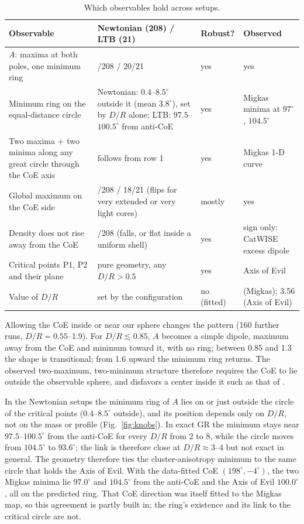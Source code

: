 \documentclass[11pt,a4paper]{article}
\newcommand{\dg}{^\circ}
\begin{document}
\begin{table}[!htb]\centering\small
\caption{Which observables hold across setups.}\label{tab:knobs}
\begin{tabularx}{\textwidth}{>{\raggedright\arraybackslash}p{5.2cm}>{\raggedright\arraybackslash}X>{\raggedright\arraybackslash}p{2.5cm}>{\raggedright\arraybackslash}p{2.3cm}}\toprule
Observable & Newtonian (208) / LTB (21) & Robust? & Observed\\\midrule
$A$: maxima at both poles, one minimum ring & 208/208 / 20/21 & yes & yes\\
Minimum ring on the equal-distance circle & Newtonian: $0.4$--$8.5\dg$ outside it (mean $3.8\dg$), set by $D/R$ alone; LTB: $97.5$--$100.5\dg$ from anti-CoE & yes & Migkas minima at $97\dg$, $104.5\dg$\\
Two maxima + two minima along any great circle through the CoE axis & follows from row 1 & yes & Migkas 1-D curve\\
Global maximum on the CoE side & 180/208 / 18/21 (flips for very extended or very light cores) & mostly & yes\\
Density does not rise away from the CoE & 208/208 (falls, or flat inside a uniform shell) & yes & sign only: CatWISE excess dipole\\
Critical points P1, P2 and their plane & pure geometry, any $D/R>0.5$ & yes & Axis of Evil\\
Value of $D/R$ & set by the configuration & no (fitted) & 3.44 (Migkas); 3.56 (Axis of Evil)\\\bottomrule
\end{tabularx}
\end{table}

Allowing the CoE inside or near our sphere changes the pattern (160 further runs, $D/R=0.55$--1.9). For $D/R\lesssim0.85$, $A$ becomes a simple dipole, maximum away from the CoE and minimum toward it, with no ring; between 0.85 and 1.3 the shape is transitional; from 1.6 upward the minimum ring returns. The observed two-maximum, two-minimum structure therefore requires the CoE to lie outside the observable sphere, and disfavors a center inside it such as that of \cite{Bao23}.

In the Newtonian setups the minimum ring of $A$ lies on or just outside the circle of the critical points ($0.4$--$8.5\dg$ outside), and its position depends only on $D/R$, not on the mass or profile (Fig.~\ref{fig:knobs}). In exact GR the minimum stays near $97.5$--$100.5\dg$ from the anti-CoE for every $D/R$ from 2 to 8, while the circle moves from $104.5\dg$ to $93.6\dg$; the link is therefore close at $D/R\approx3$--4 but not exact in general. The geometry therefore ties the cluster-anisotropy minimum to the same circle that holds the Axis of Evil. With the data-fitted CoE $(198\dg,-4\dg)$, the two Migkas minima lie $97.0\dg$ and $104.5\dg$ from the anti-CoE and the Axis of Evil $100.0\dg$, all on the predicted ring. That CoE direction was itself fitted to the Migkas map, so this agreement is partly built in; the ring's existence and its link to the critical circle are not.
\end{document}
